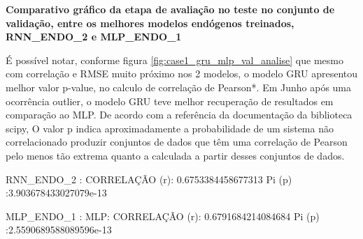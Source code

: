 \documentclass[	12pt, Times, openright, twoside, a4paper, english, brazil]{abntex2}
\begin{document}
                \textbf{Comparativo gráfico da etapa de avaliação no teste no conjunto de validação, entre os melhores modelos endógenos treinados, RNN\_ENDO\_2 e MLP\_ENDO\_1}
                
                
                  É possível notar, conforme figura \ref{fig:case1_gru_mlp_val_analise} que mesmo com correlação e RMSE muito próximo nos 2 modelos, o modelo GRU apresentou melhor valor p-value, no calculo de correlação de Pearson*. 
                  Em Junho após uma ocorrência outlier, o modelo GRU teve melhor recuperação de resultados em comparação ao MLP.
                  De acordo com a referência da documentação da biblioteca scipy, O valor p indica aproximadamente a probabilidade de um sistema não correlacionado produzir conjuntos de dados que têm uma correlação de Pearson pelo menos tão extrema quanto a calculada a partir desses conjuntos de dados.\newline
                  
                  RNN\_ENDO\_2 :\newline 
                  CORRELAÇÃO (r): 0.6753384458677313 \newline
                  Pi (p) :3.903678433027079e-13
                  
                  
                  MLP\_ENDO\_1 :\newline 
                  MLP: CORRELAÇÃO (r): 0.6791684214084684 \newline
                  Pi (p) :2.5590689588089596e-13\newline
                  \begin{figure}[H]
                    \end{figure}
\end{document}
